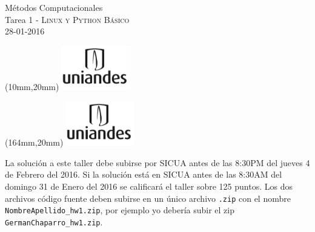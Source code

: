 \documentclass[11pt,letterpaper]{exam}
\begin{document}
\begin{center}
{\Large Métodos Computacionales} \\
Tarea 1 - \textsc{Linux y Python Básico}\\
28-01-2016\\
\end{center}

\begin{textblock*}{40mm}(10mm,20mm)
  \includegraphics[width=3cm]{logoUniandes.png}
\end{textblock*}

\begin{textblock*}{40mm}(164mm,20mm)
  \includegraphics[width=3cm]{logoUniandes.png}
\end{textblock*}

\vspace{0.3cm}

\noindent
La solución a este taller debe subirse por SICUA antes de las 8:30PM
del jueves 4 de Febrero del 2016. 
\noindent
Si la soluci\'on est\'a en SICUA
antes de las 8:30AM del domingo 31 de Enero del 2016 se calificar\'a
el taller sobre 125 puntos. 
\noindent
Los dos archivos c\'odigo fuente deben subirse en un \'unico archivo
\verb".zip" con el nombre \verb"NombreApellido_hw1.zip", por ejemplo
yo deber\'ia subir el zip \verb"GermanChaparro_hw1.zip".

\vspace{0.3cm}
\end{document}
